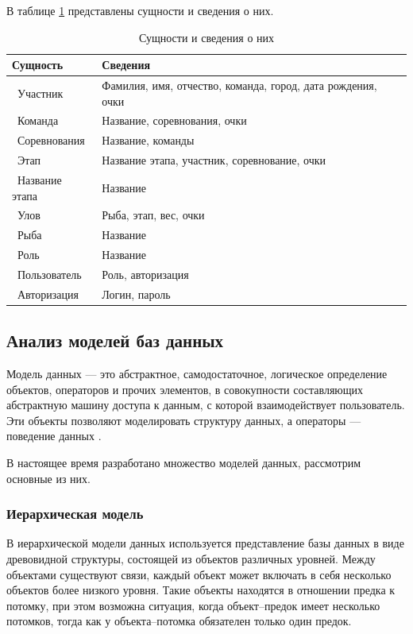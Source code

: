 В таблице \ref{decisions} представлены сущности и сведения о них.

\begin{table}[ht!]
	\centering
	\caption{Сущности и сведения о них}
	\label{decisions}
	\begin{tabular}{|p{4.3cm}|p{10.3cm}|}
		\hline
		\textbf{Сущность} & \textbf{Сведения}\\
		\hline 
		\ Участник & Фамилия, имя, отчество, команда, город, дата рождения, очки \\
		\hline 
		\ Команда & Название, соревнования, очки \\
		\hline 
		\ Соревнования & Название, команды \\
		\hline 
		\ Этап & Название этапа, участник, соревнование, очки \\
		\hline 
		\ Название этапа & Название \\
		\hline 
		\ Улов & Рыба, этап, вес, очки \\
		\hline 
		\ Рыба & Название \\
		\hline 
		\ Роль & Название \\
		\hline 
		\ Пользователь & Роль, авторизация  \\
		\hline 
		\ Авторизация & Логин, пароль \\
		\hline
	\end{tabular}
\end{table}

\subsection{Анализ моделей баз данных}

Модель данных --- это абстрактное, самодостаточное, логическое определение объектов, операторов и прочих элементов, в совокупности составляющих абстрактную машину доступа к данным, с которой взаимодействует пользователь. Эти объекты позволяют моделировать структуру данных, а операторы — поведение данных \cite{modeldb}. 

В настоящее время разработано множество моделей данных, рассмотрим основные из них.

\subsubsection{Иерархическая модель}

В иерархической модели данных используется представление базы данных в виде древовидной структуры, состоящей из объектов различных уровней. Между объектами существуют связи, каждый объект может включать в себя несколько объектов более низкого уровня. Такие объекты находятся в отношении предка к потомку, при этом возможна ситуация, когда объект--предок имеет несколько потомков, тогда как у объекта--потомка обязателен только один предок.

